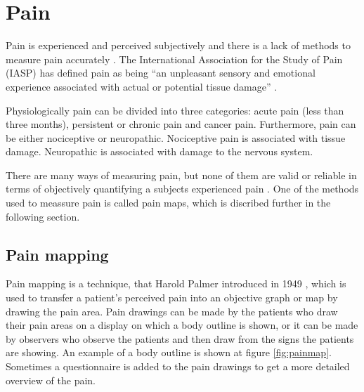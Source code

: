 \section{Pain}
Pain is experienced and perceived subjectively and there is a lack of methods to measure pain accurately \citep{IASP2012, Younger2009}. 
The International Association for the Study of Pain (IASP) has defined pain as being “an unpleasant sensory and emotional experience associated with actual or potential tissue damage” \citep{IASP2012}.

Physiologically pain can be divided into three categories: acute pain (less than three months), persistent or chronic pain and cancer pain. Furthermore, pain can be either nociceptive or neuropathic. Nociceptive pain is associated with tissue damage. Neuropathic is associated with damage to the nervous system.\citep{Briggs2010} 

There are many ways of measuring pain, but none of them are valid or reliable in terms of objectively quantifying a subjects experienced pain \citep{Younger2009}. One of the methods used to meassure pain is called pain maps, which is discribed further in the following section.   


\subsection{Pain mapping}
Pain mapping is a technique, that Harold Palmer introduced in 1949 \citep{Grunnesjo2006}, which is used to transfer a patient’s perceived pain into an objective graph or map by drawing the pain area. Pain drawings can be made by the patients who draw their pain areas on a display on which a body outline is shown, or it can be made by observers who observe the patients and then draw from the signs the patients are showing. An example of a body outline is shown at figure \ref{fig:painmap}. Sometimes a questionnaire is added to the pain drawings to get a more detailed overview of the pain.\citep{Schott2010}

